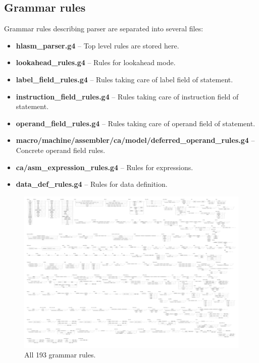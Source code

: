 \subsection{Grammar rules}

Grammar rules describing parser are separated into several files:
\begin{itemize}
	\item \textbf{hlasm\_parser.g4} -- Top level rules are stored here.
	\item \textbf{lookahead\_rules.g4} -- Rules for lookahead mode.
	\item \textbf{label\_field\_rules.g4} -- Rules taking care of label field of statement.
	\item \textbf{instruction\_field\_rules.g4} -- Rules taking care of instruction field of statement.
	\item \textbf{operand\_field\_rules.g4} -- Rules taking care of operand field of statement.
	\item \textbf{macro/machine/assembler/ca/model/deferred\_operand\_rules.g4} -- Concrete operand field rules.
	\item \textbf{ca/asm\_expression\_rules.g4} -- Rules for expressions.
	\item \textbf{data\_def\_rules.g4} -- Rules for data definition.
\end{itemize}

\begin{landscape}
	\begin{figure}
		\centering
		\includegraphics[height=\textheight]{img/grammar}
		\caption{All 193 grammar rules.}
		\label{parser:rules}
	\end{figure}
\end{landscape}

